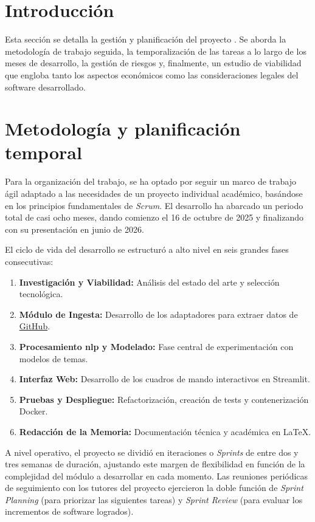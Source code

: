 
\section{Introducción}
Esta sección se detalla la gestión y planificación del proyecto
\nombreProyecto. Se aborda la metodología de trabajo seguida, la
temporalización de las tareas a lo largo de los meses de desarrollo, la gestión
de riesgos y, finalmente, un estudio de viabilidad que engloba tanto los
aspectos económicos como las consideraciones legales del software desarrollado.

\section{Metodología y planificación temporal}
Para la organización del trabajo, se ha optado por seguir un marco de trabajo
ágil adaptado a las necesidades de un proyecto individual académico, basándose
en los principios fundamentales de \textit{Scrum}. El desarrollo ha abarcado un
periodo total de casi ocho meses, dando comienzo el 16 de octubre de 2025 y
finalizando con su presentación en junio de 2026.

El ciclo de vida del desarrollo se estructuró a alto nivel en seis grandes
fases consecutivas:
\begin{enumerate}
    \item \textbf{Investigación y Viabilidad:} Análisis del estado del arte y selección tecnológica.
    \item \textbf{Módulo de Ingesta:} Desarrollo de los adaptadores para extraer datos de \href{https://github.com}{GitHub}.
    \item \textbf{Procesamiento \acrshort{nlp} y Modelado:} Fase central de experimentación con modelos de temas.
    \item \textbf{Interfaz Web:} Desarrollo de los cuadros de mando interactivos en Streamlit.
    \item \textbf{Pruebas y Despliegue:} Refactorización, creación de tests y contenerización Docker.
    \item \textbf{Redacción de la Memoria:} Documentación técnica y académica en \LaTeX.
\end{enumerate}

A nivel operativo, el proyecto se dividió en iteraciones o \textit{Sprints} de
entre dos y tres semanas de duración, ajustando este margen de flexibilidad en
función de la complejidad del módulo a desarrollar en cada momento. Las
reuniones periódicas de seguimiento con los tutores del proyecto ejercieron la
doble función de \textit{Sprint Planning} (para priorizar las siguientes
tareas) y \textit{Sprint Review} (para evaluar los incrementos de software
logrados).

